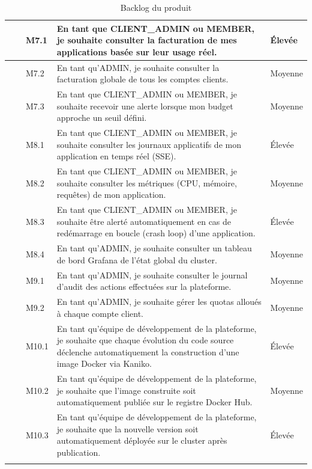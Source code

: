 {\begin{longtable}{|>{\centering\arraybackslash}m{1.1cm}|>{\centering\arraybackslash}m{2.9cm}|>{\centering\arraybackslash}m{1.4cm}|>{\raggedright\arraybackslash}p{6.6cm}|>{\centering\arraybackslash}m{2.3cm}|}
\multirow{3}{*}{M7} & \multirow{3}{2.9cm}{\centering Facturation} & M7.1 & En tant que CLIENT\_ADMIN ou MEMBER, je souhaite consulter la facturation de mes applications basée sur leur usage réel. & Élevée\\
\cline{3-5}
&& M7.2 & En tant qu'ADMIN, je souhaite consulter la facturation globale de tous les comptes clients. & Moyenne\\
\cline{3-5}
&& M7.3 & En tant que CLIENT\_ADMIN ou MEMBER, je souhaite recevoir une alerte lorsque mon budget approche un seuil défini. & Moyenne\\
\hline

\multirow{4}{*}{M8} & \multirow{4}{2.9cm}{\centering Monitoring \& Observabilité} & M8.1 & En tant que CLIENT\_ADMIN ou MEMBER, je souhaite consulter les journaux applicatifs de mon application en temps réel (SSE). & Élevée\\
\cline{3-5}
&& M8.2 & En tant que CLIENT\_ADMIN ou MEMBER, je souhaite consulter les métriques (CPU, mémoire, requêtes) de mon application. & Moyenne\\
\cline{3-5}
&& M8.3 & En tant que CLIENT\_ADMIN ou MEMBER, je souhaite être alerté automatiquement en cas de redémarrage en boucle (crash loop) d'une application. & Élevée\\
\cline{3-5}
&& M8.4 & En tant qu'ADMIN, je souhaite consulter un tableau de bord Grafana de l'état global du cluster. & Moyenne\\
\hline

\multirow{2}{*}{M9} & \multirow{2}{2.9cm}{\centering Administration plateforme} & M9.1 & En tant qu'ADMIN, je souhaite consulter le journal d'audit des actions effectuées sur la plateforme. & Moyenne\\
\cline{3-5}
&& M9.2 & En tant qu'ADMIN, je souhaite gérer les quotas alloués à chaque compte client. & Moyenne\\
\hline

\multirow{3}{*}{M10} & \multirow{3}{2.9cm}{\centering CI/CD} & M10.1 & En tant qu'équipe de développement de la plateforme, je souhaite que chaque évolution du code source déclenche automatiquement la construction d'une image Docker via Kaniko. & Élevée\\
\cline{3-5}
&& M10.2 & En tant qu'équipe de développement de la plateforme, je souhaite que l'image construite soit automatiquement publiée sur le registre Docker Hub. & Moyenne\\
\cline{3-5}
&& M10.3 & En tant qu'équipe de développement de la plateforme, je souhaite que la nouvelle version soit automatiquement déployée sur le cluster après publication. & Élevée\\
\hline
\caption{Backlog du produit}
\label{tab:backlog}
\end{longtable}
}

